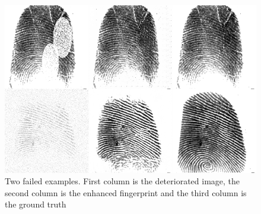 \documentclass[a4paper,fleqn]{cas-dc}
\begin{document}
\begin{figure}[htbp]
\centerline{\includegraphics[scale=0.28]{figs/recons_failed.png}}
\caption{Two failed examples. First column is the deteriorated image, the second column is the enhanced fingerprint and the third column is the ground truth}
\label{fig8}
\end{figure}
\end{document}
